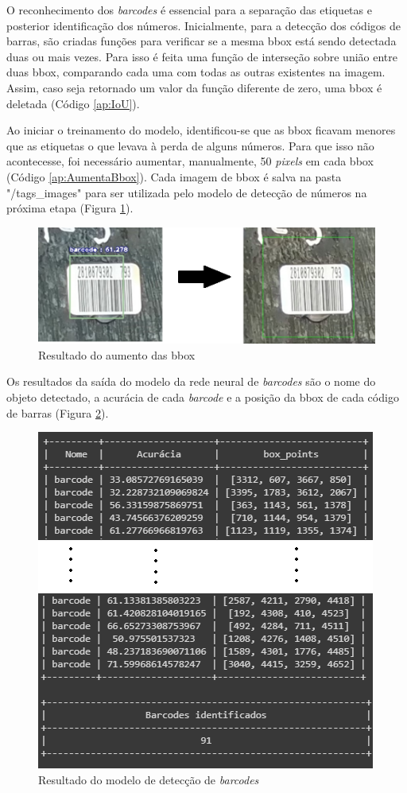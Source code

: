 O reconhecimento dos \textit{barcodes} é essencial para a separação das etiquetas e posterior identificação dos números.
%
Inicialmente, para a detecção dos códigos de barras, são criadas funções para verificar se a mesma bbox está sendo detectada duas ou mais vezes. Para isso é feita uma função de interseção sobre união entre duas bbox, comparando cada uma com todas as outras existentes na imagem. Assim, caso seja retornado um valor da função diferente de zero, uma bbox é deletada (Código \ref{ap:IoU}).

Ao iniciar o treinamento do modelo, identificou-se que as bbox ficavam menores que as etiquetas o que levava à perda de alguns números. Para que isso não acontecesse, foi necessário aumentar, manualmente, 50 \textit{pixels} em cada bbox (Código \ref{ap:AumentaBbox}).
%
Cada imagem de bbox é salva na pasta "/tags\_images" para ser utilizada pelo modelo de detecção de números na próxima etapa (Figura \ref{fig:bboxNew}).

\begin{figure}[H]
	\centering
	\includegraphics[width=1\linewidth]{figuras/MachineLearning/bboxNew.png}
	\caption{Resultado do aumento das bbox}
	\label{fig:bboxNew}
\end{figure}



Os resultados da saída do modelo da rede neural de \textit{barcodes} são o nome do objeto detectado, a acurácia de cada \textit{barcode} e a posição da bbox de cada código de barras (Figura \ref{fig:indentBarcodes}).

\begin{figure}[H]
	\centering
	\includegraphics[width=0.6\linewidth]{figuras/MachineLearning/indentBarcodes.png}
	\caption{ Resultado do modelo de detecção de \textit{barcodes}}
	\label{fig:indentBarcodes}
\end{figure}


